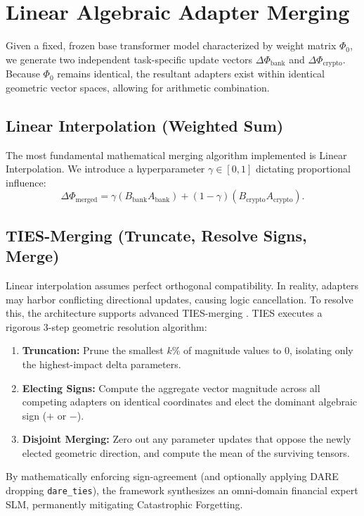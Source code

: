 \documentclass[12pt,a4paper]{report}
\begin{document}
\section{Linear Algebraic Adapter Merging}

Given a fixed, frozen base transformer model characterized by weight matrix $\Phi_0$, we generate two independent task-specific update vectors $\Delta\Phi_{\text{bank}}$ and $\Delta\Phi_{\text{crypto}}$. Because $\Phi_0$ remains identical, the resultant adapters exist within identical geometric vector spaces, allowing for arithmetic combination. 

\subsection{Linear Interpolation (Weighted Sum)}
The most fundamental mathematical merging algorithm implemented is Linear Interpolation. We introduce a hyperparameter $\gamma \in [0, 1]$ dictating proportional influence:
\begin{equation}
    \Delta\Phi_{\text{merged}} = \gamma (B_{\text{bank}} A_{\text{bank}}) + (1 - \gamma) (B_{\text{crypto}} A_{\text{crypto}}).
\end{equation}

\subsection{TIES-Merging (Truncate, Resolve Signs, Merge)}
Linear interpolation assumes perfect orthogonal compatibility. In reality, adapters may harbor conflicting directional updates, causing logic cancellation. To resolve this, the architecture supports advanced TIES-merging \cite{yadav2023ties}. TIES executes a rigorous 3-step geometric resolution algorithm:
\begin{enumerate}
    \item \textbf{Truncation:} Prune the smallest $k\%$ of magnitude values to $0$, isolating only the highest-impact delta parameters.
    \item \textbf{Electing Signs:} Compute the aggregate vector magnitude across all competing adapters on identical coordinates and elect the dominant algebraic sign ($+$ or $-$).
    \item \textbf{Disjoint Merging:} Zero out any parameter updates that oppose the newly elected geometric direction, and compute the mean of the surviving tensors.
\end{enumerate}
By mathematically enforcing sign-agreement (and optionally applying DARE dropping \texttt{dare_ties}), the framework synthesizes an omni-domain financial expert SLM, permanently mitigating Catastrophic Forgetting.
\end{document}
